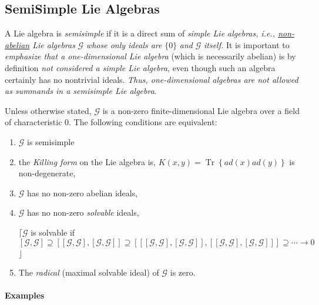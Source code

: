 \documentclass[aps,preprint]{revtex4}%
\begin{document}
\subsection{SemiSimple Lie Algebras}

A Lie algebra is \emph{semisimple} if it is a direct sum of \emph{simple Lie
algebras, i.e., \underline{\emph{non-abelian}} Lie algebras }$\mathcal{G}%
$\emph{ whose only ideals are }$\{0\}$\emph{ and }$\mathcal{G}$\emph{ itself.}
It is important to \emph{emphasize that a one-dimensional Lie algebra} (which
is necessarily abelian) is by definition \emph{not considered a simple Lie
algebra}, even though such an algebra certainly has no nontrivial ideals.
\emph{Thus, one-dimensional algebras are not allowed as summands in a
semisimple Lie algebra}.

Unless otherwise stated, $\mathcal{G}$ is a non-zero finite-dimensional Lie
algebra over a field of characteristic $0$. The following conditions are equivalent:

\begin{enumerate}
\item $\mathcal{G}$ is semisimple

\item the \emph{Killing form} on the Lie algebra is, $K\left(  x,y\right)
=\operatorname{Tr}\left\{  ad\left(  x\right)  ad\left(  y\right)  \right\}  $
is non-degenerate,

\item $\mathcal{G}$ has no non-zero abelian ideals,

\item $\mathcal{G}$ has no non-zero \emph{solvable} ideals,

$\lceil\mathcal{G}$ is solvable if
\begin{equation}
\left[  \mathcal{G},\mathcal{G}\right]  \supseteq\left[  \left[
\mathcal{G},\mathcal{G}\right]  ,\left[  \mathcal{G},\mathcal{G}\right]
\right]  \supseteq\left[  \left[  \left[  \mathcal{G},\mathcal{G}\right]
,\left[  \mathcal{G},\mathcal{G}\right]  \right]  ,\left[  \left[
\mathcal{G},\mathcal{G}\right]  ,\left[  \mathcal{G},\mathcal{G}\right]
\right]  \right]  \supseteq\cdots\rightarrow0
\end{equation}
$\rfloor$

\item The \emph{radical} (maximal solvable ideal) of $\mathcal{G}$ is zero.
\end{enumerate}

\paragraph{Examples}
\end{document}
